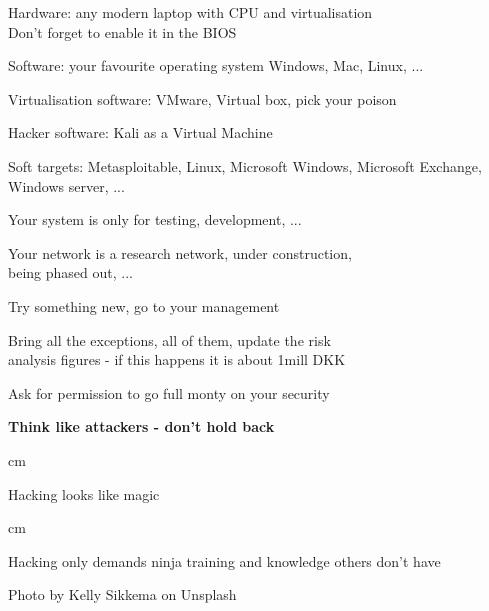 \documentclass[Screen16to9,17pt]{foils}
\begin{document}


\begin{list2}
\item Hardware: any modern laptop with CPU and virtualisation\\
Don't forget to enable it in the BIOS
\item Software: your favourite operating system Windows, Mac, Linux, ...
\item Virtualisation software: VMware, Virtual box, pick your poison
\item Hacker software: Kali as a Virtual Machine 
\item Soft targets: Metasploitable, Linux, Microsoft Windows, Microsoft Exchange, Windows server, ...
\end{list2}



Your system is only for testing, development, ...

Your network is a research network, under construction, \\
being phased out, ...

Try something new, go to your management

Bring all the exceptions, all of them, update the risk \\
analysis figures - if this happens it is about 1mill DKK

Ask for permission to go full monty on your security

{\bf Think like attackers - don't hold back}






 cm

Hacking looks like magic




 cm
\centerline{Hacking only demands ninja training and knowledge others don't have}

\slide{}


\hfill {\footnotesize Photo by Kelly Sikkema on Unsplash}
\end{document}

